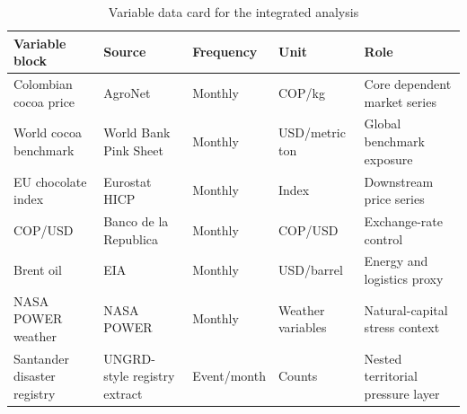 \begin{table}
\caption{Variable data card for the integrated analysis}
\label{tab:data_card}
\begin{tabular}{lllll}
\toprule
Variable block & Source & Frequency & Unit & Role \\
\midrule
Colombian cocoa price & AgroNet & Monthly & COP/kg & Core dependent market series \\
World cocoa benchmark & World Bank Pink Sheet & Monthly & USD/metric ton & Global benchmark exposure \\
EU chocolate index & Eurostat HICP & Monthly & Index & Downstream price series \\
COP/USD & Banco de la Republica & Monthly & COP/USD & Exchange-rate control \\
Brent oil & EIA & Monthly & USD/barrel & Energy and logistics proxy \\
NASA POWER weather & NASA POWER & Monthly & Weather variables & Natural-capital stress context \\
Santander disaster registry & UNGRD-style registry extract & Event/month & Counts & Nested territorial pressure layer \\
\bottomrule
\end{tabular}
\end{table}
